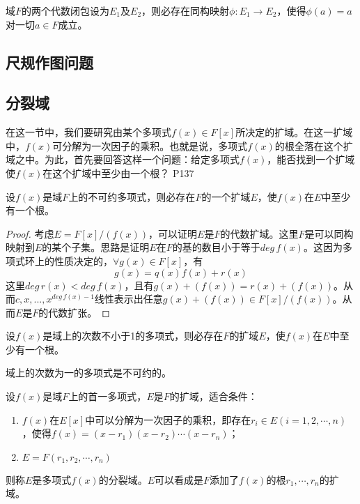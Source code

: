 \begin{theorem}
	域$F$的两个代数闭包设为$E_{1}$及$E_{2}$，则必存在同构映射$\phi:E_{1}\rightarrow E_{2}$，使得$\phi(a)=a$对一切$a\in F$成立。
\end{theorem}

\subsection{尺规作图问题}



\subsection{分裂域}

\original
{
	在这一节中，我们要研究由某个多项式$f(x)\in F[x]$所决定的扩域。在这一扩域中，$f(x)$可分解为一次因子的乘积。也就是说，多项式$f(x)$的根全落在这个扩域之中。为此，首先要回答这样一个问题：给定多项式$f(x)$，能否找到一个扩域使$f(x)$在这个扩域中至少由一个根？
}
{P137}

\begin{lemma}
	设$f(x)$是域$F$上的不可约多项式，则必存在$F$的一个扩域$E$，使$f(x)$在$E$中至少有一个根。
\end{lemma}

\begin{proof}
	考虑$E=F[x]/(f(x))$，可以证明$E$是$F$的代数扩域。这里$F$是可以同构映射到$E$的某个子集。思路是证明$E$在$F$的基的数目小于等于$deg\, f(x)$。这因为多项式环上的性质决定的，$\forall g(x)\in F[x]$，有
	\begin{equation*}
		g(x)=q(x)f(x)+r(x)
	\end{equation*}
	这里$deg\,r(x)< deg\,f(x) $，且有$g(x)+(f(x))=r(x)+(f(x))$。从而$c,x,...,x^{deg\,f(x)-1}$线性表示出任意$g(x)+(f(x))\in  F[x]/(f(x))$。从而$E$是$F$的代数扩张。
\end{proof}

\begin{corollary}[Kronecker定理]
	设$f(x)$是域上的次数不小于1的多项式，则必存在$F$的扩域$E$，使$f(x)$在$E$中至少有一个根。
\end{corollary}
\begin{hint}
	域上的次数为一的多项式是不可约的。
\end{hint}


\begin{definition}
	设$f(x)$是域$F$上的首一多项式，$E$是$F$的扩域，适合条件：
	\begin{enumerate}
		\item $f(x)$在$E[x]$中可以分解为一次因子的乘积，即存在$r_{i}\in E(i=1,2,\cdots,n)$，使得$f(x)=(x-r_{1})(x-r_{2})\cdots(x-r_{n})$；
		\item $E=F(r_{1},r_{2},\cdots,r_{n})$
	\end{enumerate}
	则称$E$是多项式$f(x)$的分裂域。$E$可以看成是$F$添加了$f(x)$的根$r_{1},\cdots,r_{n}$的扩域。
\end{definition}


